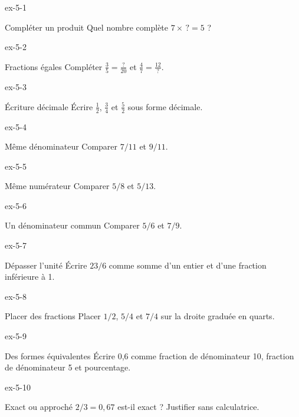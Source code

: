 \clearpage{}
\begin{blocLivre}{ex-5-1}\begin{exercice}[1]{Compléter un produit}
Quel nombre complète $7\times\,?=5$ ?
\end{exercice}\end{blocLivre}
\begin{blocLivre}{ex-5-2}\begin{exercice}[1]{Fractions égales}
Compléter $\frac35=\frac{\,?\,}{20}$ et $\frac47=\frac{12}{\,?\,}$.
\end{exercice}\end{blocLivre}
\begin{blocLivre}{ex-5-3}\begin{exercice}[1]{Écriture décimale}
Écrire $\frac12$, $\frac34$ et $\frac52$ sous forme décimale.
\end{exercice}\end{blocLivre}
\begin{blocLivre}{ex-5-4}\begin{exercice}[1]{Même dénominateur}
Comparer $7/11$ et $9/11$.
\end{exercice}\end{blocLivre}
\begin{blocLivre}{ex-5-5}\begin{exercice}[1]{Même numérateur}
Comparer $5/8$ et $5/13$.
\end{exercice}\end{blocLivre}

\begin{blocLivre}{ex-5-6}\begin{exercice}[2]{Un dénominateur commun}
Comparer $5/6$ et $7/9$.
\end{exercice}\end{blocLivre}
\begin{blocLivre}{ex-5-7}\begin{exercice}[2]{Dépasser l’unité}
Écrire $23/6$ comme somme d’un entier et d’une fraction inférieure à 1.
\end{exercice}\end{blocLivre}
\begin{blocLivre}{ex-5-8}\begin{exercice}[2]{Placer des fractions}
Placer $1/2$, $5/4$ et $7/4$ sur la droite graduée en quarts.
\label{fig-ex-5-8}
\end{exercice}\end{blocLivre}
\begin{blocLivre}{ex-5-9}\begin{exercice}[2]{Des formes équivalentes}
Écrire 0,6 comme fraction de dénominateur 10, fraction de dénominateur 5 et pourcentage.
\end{exercice}\end{blocLivre}
\begin{blocLivre}{ex-5-10}\begin{exercice}[2]{Exact ou approché}
$2/3=0{,}67$ est-il exact ? Justifier sans calculatrice.
\end{exercice}\end{blocLivre}

